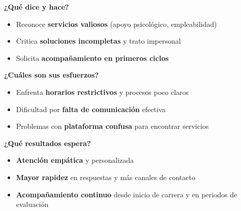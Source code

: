 \documentclass{article}
\begin{document}
\textbf{¿Qué dice y hace?}
\begin{itemize}[leftmargin=*]
    \item Reconoce \textbf{servicios valiosos} (apoyo psicológico, empleabilidad)
    \item Critica \textbf{soluciones incompletas} y trato impersonal
    \item Solicita \textbf{acompañamiento en primeros ciclos}
\end{itemize}

\textbf{¿Cuáles son sus esfuerzos?}
\begin{itemize}[leftmargin=*]
    \item Enfrenta \textbf{horarios restrictivos} y procesos poco claros
    \item Dificultad por \textbf{falta de comunicación} efectiva
    \item Problemas con \textbf{plataforma confusa} para encontrar servicios
\end{itemize}

\textbf{¿Qué resultados espera?}
\begin{itemize}[leftmargin=*]
    \item \textbf{Atención empática} y personalizada
    \item \textbf{Mayor rapidez} en respuestas y más canales de contacto
    \item \textbf{Acompañamiento continuo} desde inicio de carrera y en periodos de evaluación
\end{itemize}
\end{document}

